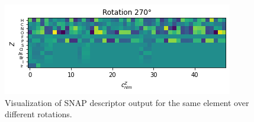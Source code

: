\begin{figure}
\begin{multicols}{2}
      \includegraphics[width=\linewidth]{figures/regression/snap/rot270.png}\par
  \end{multicols}
  \caption{Visualization of SNAP descriptor output for the same element over different rotations.}
  \label{fig:snap_roation_out}
\end{figure}



